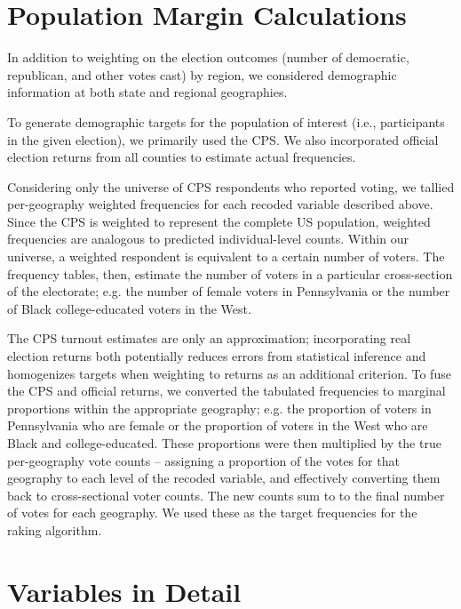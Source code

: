 \documentclass[12pt]{article}
\begin{document}
\section{Population Margin Calculations}

In addition to weighting on the election outcomes (number of democratic, republican, and other votes cast) by region, we considered demographic information at both state and regional geographies.

To generate demographic targets for the population of interest (i.e., participants in the given election), we primarily used the CPS. We also incorporated official election returns from all counties to estimate actual frequencies.

Considering only the universe of CPS respondents who reported voting, we tallied per-geography weighted frequencies for each recoded variable described above. Since the CPS is weighted to represent the complete US population, weighted frequencies are analogous to predicted individual-level counts. Within our universe, a weighted respondent is equivalent to a certain number of voters. The frequency tables, then, estimate the number of voters in a particular cross-section of the electorate; e.g. the number of female voters in Pennsylvania or the number of Black college-educated voters in the West.

The CPS turnout estimates are only an approximation; incorporating real election returns both potentially reduces errors from statistical inference and homogenizes targets when weighting to returns as an additional criterion. To fuse the CPS and official returns, we converted the tabulated frequencies to marginal proportions within the appropriate geography; e.g. the proportion of voters in Pennsylvania who are female or the proportion of voters in the West who are Black and college-educated. These proportions were then multiplied by the true per-geography vote counts -- assigning a proportion of the votes for that geography to each level of the recoded variable, and effectively converting them back to cross-sectional voter counts. The new counts sum to to the final number of votes for each geography. We used these as the target frequencies for the raking algorithm.


\section{Variables in Detail}
\end{document}
